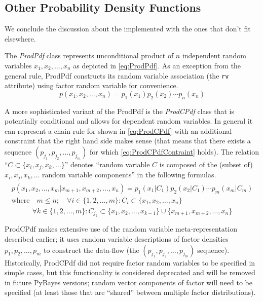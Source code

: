 \subsection{Other Probability Density Functions}

We conclude the discussion about the implemented {\pdfs} with the ones that don't fit elsewhere.

The \emph{ProdPdf} class represents unconditional product of \(n\) independent random variables
\(x_1, x_2, \dotsc, x_n\) as depicted in \eqref{eq:ProdPdf}. As an exception from the general rule,
ProdPdf constructs its random variable association (the \verb|rv| attribute) using factor random
variable for convenience.
\begin{equation} \label{eq:ProdPdf}
	p(x_1, x_2, \dotsc, x_n) = p_1(x_1) p_2(x_2) \dotsm p_n(x_n)
\end{equation}

A more sophisticated variant of the ProdPdf is the \emph{ProdCPdf} class that is potentially
conditional and allows for dependent random variables. In general it can represent a chain rule for
{\pdfs} shown in \eqref{eq:ProdCPdf} with an additional constraint that the right hand side makes
sense (that means that there exists a sequence \((p_{j_1}, p_{j_2}, \dotsc, p_{j_m})\) for which
\eqref{eq:ProdCPdfContraint} holds). The relation ``\(C \subset \{x_i, x_j, x_k, \dotsc\}\)'' denotes
``random variable \(C\) is composed of the (subset of) \(x_i, x_j, x_k, \dotsc\) random variable components''
in the following formulas.
\begin{gather} \label{eq:ProdCPdf}
	\begin{gathered}
		p(x_1, x_2, \dotsc, x_m | x_{m+1}, x_{m+2} , \dotsc, x_n) = p_1(x_1 | C_1)
			p_2(x_2 | C_1) \dotsm p_m(x_m | C_m) \\
		\text{where} \quad m \leq n; \quad
			\forall i \in \{1, 2, \dotsc, m\}: C_i \subset \{x_1, x_2, \dotsc, x_n\}
	\end{gathered}
\end{gather}
\begin{equation} \label{eq:ProdCPdfContraint}
	\forall k \in \{1, 2, \dotsc, m\}: C_{j_k} \subset \{x_1, x_2, \dotsc, x_{k-1}\} \cup \{x_{m+1}, x_{m+2} , \dotsc, x_n\}
\end{equation}

ProdCPdf makes extensive use of the random variable meta-representation described earlier; it uses
random variable descriptions of factor densities \(p_1, p_2, \dotsc, p_m\) to construct the
data-flow (the \((p_{j_1}, p_{j_2}, \dotsc, p_{j_m})\) sequence). Historically, ProdCPdf did not
require factor random variables to be specified in simple cases, but this functionality is considered
deprecated and will be removed in future PyBayes versions; random vector components of factor {\pdfs}
will need to be specified (at least those that are ``shared'' between multiple factor distributions).

